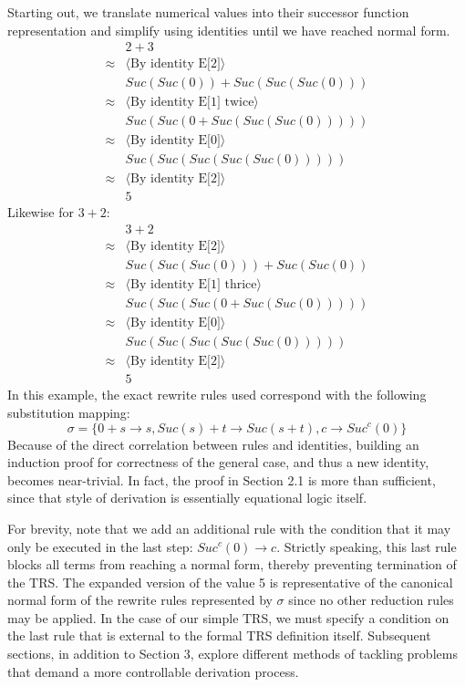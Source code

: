 \documentclass{article}
\begin{document}
Starting out, we translate numerical values into their successor function representation and simplify using identities until we have reached normal form.
\begin{align*}
    &2 + 3\\
    \approx& \langle \text{By identity E[2]} \rangle\\
    &Suc(Suc(0)) + Suc(Suc(Suc(0)))\\
    \approx& \langle \text{By identity E[1] twice} \rangle\\
    &Suc(Suc(0 + Suc(Suc(Suc(0)))))\\
    \approx& \langle \text{By identity E[0]} \rangle\\
    &Suc(Suc(Suc(Suc(Suc(0)))))\\
    \approx& \langle \text{By identity E[2]} \rangle\\
    &5
\end{align*}
Likewise for $3+2$:
\begin{align*}
    &3 + 2\\
    \approx& \langle \text{By identity E[2]} \rangle\\
    &Suc(Suc(Suc(0))) + Suc(Suc(0))\\
    \approx& \langle \text{By identity E[1] thrice} \rangle\\
    &Suc(Suc(Suc(0 + Suc(Suc(0)))))\\
    \approx& \langle \text{By identity E[0]} \rangle\\
    &Suc(Suc(Suc(Suc(Suc(0)))))\\
    \approx& \langle \text{By identity E[2]} \rangle\\
    &5
\end{align*}
In this example, the exact rewrite rules used correspond with the following substitution mapping:
\[\sigma = \{0 + s \rightarrow s, Suc(s) + t \rightarrow Suc(s + t), c \rightarrow Suc^c(0)\}\]
Because of the direct correlation between rules and identities, building an induction proof for correctness of the general case,
and thus a new identity, becomes near-trivial. In fact, the proof in Section 2.1 is more than sufficient, since that style of derivation
is essentially equational logic itself.

For brevity, note that we add an additional rule with the condition that it may only be executed in the last step: $Suc^c(0) \rightarrow c$.
Strictly speaking, this last rule blocks all terms from reaching a normal form, thereby preventing termination of the TRS.
The expanded version of the value 5 is representative of the canonical normal form of the rewrite rules represented by $\sigma$ since no other reduction rules may be applied.
In the case of our simple TRS, we must specify a condition on the last rule that is external to the formal TRS definition itself.
Subsequent sections, in addition to Section 3, explore different methods of tackling problems that demand a more controllable derivation process.
\end{document}
